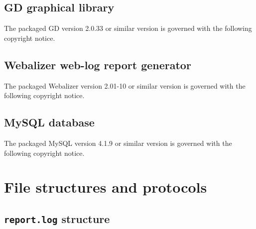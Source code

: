 \documentclass[10pt,a4paper]{article}
\makeatletter
\newenvironment{p}{\@open{P}{}}{\@close{P}}
\newenvironment{p}{}{\par}
\newcommand\sectionbr{}
\newcommand\subsectionbr{}
\makeatother
\begin{document}
\newpage
\subsection{GD graphical library\subsectionbr}

\begin{p}
The packaged GD version 2.0.33 or similar version is governed with the
following copyright notice.
\end{p}

{\tiny\begin{multicols}{2}\end{multicols}}

\newpage
\subsection{Webalizer web-log report generator\subsectionbr}

\begin{p}
The packaged Webalizer version 2.01-10 or similar version is governed with the
following copyright notice.
\end{p}

{\tiny\begin{multicols}{2}\end{multicols}}

\newpage
\subsection{MySQL database\subsectionbr}

\begin{p}
The packaged MySQL version 4.1.9 or similar version is governed with the
following copyright notice.
\end{p}

{\tiny\begin{multicols}{2}\end{multicols}}

\newpage


\newpage
\section{File structures and protocols\sectionbr}

\subsection{\label{sec:reportlog-format}
  \texttt{report.log} structure\subsectionbr}
\end{document}
